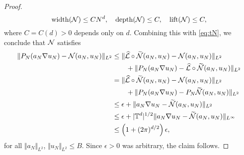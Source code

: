 \documentclass[reqno,a4paper]{amsart}
\begin{document}
\begin{proof}
\[
\mathrm{width}(\mathcal{N}) \le C N^d, 
\quad
\mathrm{depth}(\mathcal{N}) \le C, 
\quad
\mathrm{lift}(\mathcal{N}) \le C,
\]
where $C = C(d)>0$ depends only on $d$. Combining this with \eqref{eq:tN}, we conclude that $\mathcal{N}$ satisfies
\begin{align*}
\Vert P_N(a_N\nabla u_N) - \mathcal{N}(a_N,u_N) \Vert_{L^2} 
&\le
\Vert \widehat{\mathcal{L}} \circ \widetilde{\mathcal{N}}(a_N,u_N) - \mathcal{N}(a_N,u_N) \Vert_{L^2} 
\\
&\qquad
+\Vert P_N(a_N\nabla u_N)  - \widehat{\mathcal{L}} \circ \widetilde{\mathcal{N}}(a_N,u_N) \Vert_{L^2} 
\\
&=
\Vert \widehat{\mathcal{L}} \circ \widetilde{\mathcal{N}}(a_N,u_N) - \mathcal{N}(a_N,u_N) \Vert_{L^2} 
\\
&\qquad
+\Vert P_N(a_N\nabla u_N)  - P_N \widetilde{\mathcal{N}}(a_N,u_N) \Vert_{L^2} 
\\
&\le 
\epsilon + \Vert a_N\nabla u_N - \widetilde{\mathcal{N}}(a_N,u_N) \Vert_{L^2} 
\\
&\le 
\epsilon + |\mathbb{T}^d|^{1/2} \Vert a_N\nabla u_N - \widetilde{\mathcal{N}}(a_N,u_N) \Vert_{L^\infty} 
\\
&\le
\left( 1 + (2\pi)^{d/2} \right) \epsilon,
\end{align*}
for all $\Vert a_N \Vert_{L^2}$, $\Vert u_N \Vert_{L^2} \le B$. Since $\epsilon > 0$ was arbitrary, the claim follows.
\end{proof}
\end{document}
